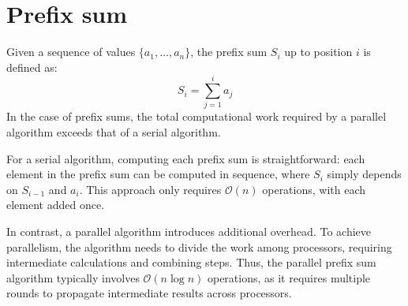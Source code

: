 \section{Prefix sum}

Given a sequence of values $\{a_1,\dots,a_n\}$, the prefix sum $S_i$ up to position $i$ is defined as:
\[S_i=\sum_{j=1}^ia_j\]
In the case of prefix sums, the total computational work required by a parallel algorithm exceeds that of a serial algorithm.

For a serial algorithm, computing each prefix sum is straightforward: each element in the prefix sum can be computed in sequence, where $S_i$ simply depends on $S_{i-1}$ and $a_i$. 
This approach only requires $\mathcal{O}(n)$ operations, with each element added once.

In contrast, a parallel algorithm introduces additional overhead. 
To achieve parallelism, the algorithm needs to divide the work among processors, requiring intermediate calculations and combining steps.
Thus, the parallel prefix sum algorithm typically involves $\mathcal{O}(n\log n)$ operations, as it requires multiple rounds to propagate intermediate results across processors.